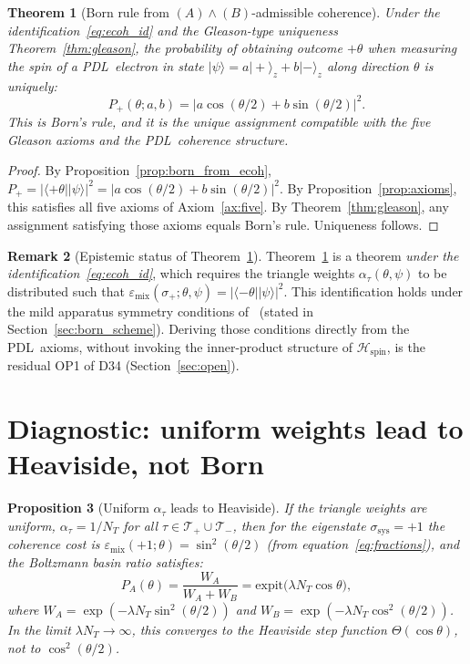 \documentclass[11pt,a4paper]{article}
\newtheorem{theorem}{Theorem}[section]
\newtheorem{proposition}[theorem]{Proposition}
\theoremstyle{definition}
\newtheorem{remark}[theorem]{Remark}
\newcommand{\PDL}{\textnormal{PDL}}
\newcommand{\Hspin}{\mathcal{H}_{\mathrm{spin}}}
\newcommand{\emix}{\varepsilon_{\mathrm{mix}}}
\newcommand{\Tplus}{\mathcal{T}_+}
\newcommand{\Tminus}{\mathcal{T}_-}
\newcommand{\pket}[1]{|#1\rangle}
\newcommand{\pbra}[1]{\langle#1|}
\begin{document}
\begin{theorem}[Born rule from $(A)\wedge(B)$-admissible coherence]
\label{thm:born}
Under the identification~\eqref{eq:ecoh_id} and the Gleason-type uniqueness Theorem~\ref{thm:gleason}, the probability of obtaining outcome $+\theta$ when measuring the spin of a \PDL\ electron in state $\pket{\psi} = a\pket{+}_z + b\pket{-}_z$ along direction $\theta$ is uniquely:
\begin{equation}
P_+(\theta;a,b) = \bigl|a\cos(\theta/2) + b\sin(\theta/2)\bigr|^2.
\label{eq:born}
\end{equation}
This is Born's rule, and it is the unique assignment compatible with the five Gleason axioms and the \PDL\ coherence structure.
\end{theorem}

\begin{proof}
By Proposition~\ref{prop:born_from_ecoh}, $P_+ = |\pbra{+\theta}\pket{\psi}|^2 = |a\cos(\theta/2)+b\sin(\theta/2)|^2$. By Proposition~\ref{prop:axioms}, this satisfies all five axioms of Axiom~\ref{ax:five}. By Theorem~\ref{thm:gleason}, any assignment satisfying those axioms equals Born's rule. Uniqueness follows.
\end{proof}

\begin{remark}[Epistemic status of Theorem~\ref{thm:born}]
\label{rem:epistemic}
Theorem~\ref{thm:born} is a theorem \emph{under the identification~\eqref{eq:ecoh_id}}, which requires the triangle weights $\alpha_\tau(\theta,\psi)$ to be distributed such that $\emix(\sigma_+;\theta,\psi) = |\pbra{-\theta}\pket{\psi}|^2$. This identification holds under the mild apparatus symmetry conditions of~\cite{Born_PDL_2026} (stated in Section~\ref{sec:born_scheme}). Deriving those conditions directly from the \PDL\ axioms, without invoking the inner-product structure of $\Hspin$, is the residual OP1 of D34 (Section~\ref{sec:open}).
\end{remark}

\section{Diagnostic: uniform weights lead to Heaviside, not Born}
\label{sec:diagnostic}

\begin{proposition}[Uniform $\alpha_\tau$ leads to Heaviside]
\label{prop:heaviside}
If the triangle weights are uniform, $\alpha_\tau = 1/N_T$ for all $\tau \in \Tplus \cup \Tminus$, then for the eigenstate $\sigma_{\mathrm{sys}} = +1$ the coherence cost is $\emix(+1;\theta) = \sin^2(\theta/2)$ (from equation~\eqref{eq:fractions}), and the Boltzmann basin ratio satisfies:
\begin{equation}
P_A(\theta) = \frac{W_A}{W_A + W_B} = \mathrm{expit}\!\bigl(\lambda N_T\cos\theta\bigr),
\label{eq:sigmoid}
\end{equation}
where $W_A = \exp(-\lambda N_T\sin^2(\theta/2))$ and $W_B = \exp(-\lambda N_T\cos^2(\theta/2))$. In the limit $\lambda N_T \to \infty$, this converges to the Heaviside step function $\Theta(\cos\theta)$, not to $\cos^2(\theta/2)$.
\end{proposition}
\end{document}
